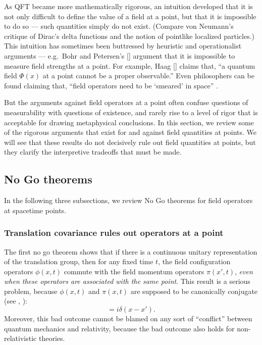 \documentclass[11pt]{article}
\theoremstyle{definition}
\theoremstyle{definition}
\newcommand{\mb}[1]{#1}
\theoremstyle{remark}
\begin{document}
As QFT became more mathematically rigorous, an intuition developed
that it is not only difficult to define the value of a field at a
point, but that it is impossible to do so --- such quantities simply
do not exist.  (Compare von Neumann's critique of Dirac's delta
functions and the notion of pointlike localized particles.)  This
intuition has sometimes been buttressed by heuristic and
operationalist arguments --- e.g.\ Bohr and Petersen's
[\citeyear{bohr}] argument that it is impossible to measure field
strengths at a point.  For example, Haag [\citeyear[p.\ 58]{haag}]
claims that, ``a quantum field $\Phi (x)$ at a point cannot be a
proper observable.''  Even philosophers can be found claiming that,
``field operators need to be `smeared' in space'' \cite[p.\ 631, fn.\
8]{nhug}.

But the arguments against field operators at a point often confuse
questions of measurability with questions of existence, and rarely
rise to a level of rigor that is acceptable for drawing metaphysical
conclusions.  In this section, we review some of the rigorous
arguments that exist for and against field quantities at points.  We
will see that these results do not decisively rule out field
quantities at points, but they clarify the interpretive tradeoffs that
must be made.

\subsection{No Go theorems}

In the following three subsections, we review No Go theorems for field
operators at spacetime points.  


\subsubsection{Translation covariance rules out operators at a point}

The first no go theorem shows that if there is a continuous unitary representation of
the translation group, then for any fixed time $t$, the field configuration operators
$\phi (\mb{x},t)$ commute with the field momentum operators $\pi (\mb{x}',t)$,
\emph{even when these operators are associated with the same point}.  This result is
a serious problem, because $\phi (\mb{x},t)$ and $\pi (\mb{x},t)$ are supposed to be
canonically conjugate (see \cite[p.\ 131]{ryder}, \cite{huggett}):
\begin{equation} [\phi (\mb{x},t),\pi (\mb{x}',t)]=i\delta
  (\mb{x}-\mb{x}') .\end{equation} Moreover, this bad outcome cannot
be blamed on any sort of ``conflict'' between quantum mechanics and
relativity, because the bad outcome also holds for non-relativistic
theories.
\end{document}
